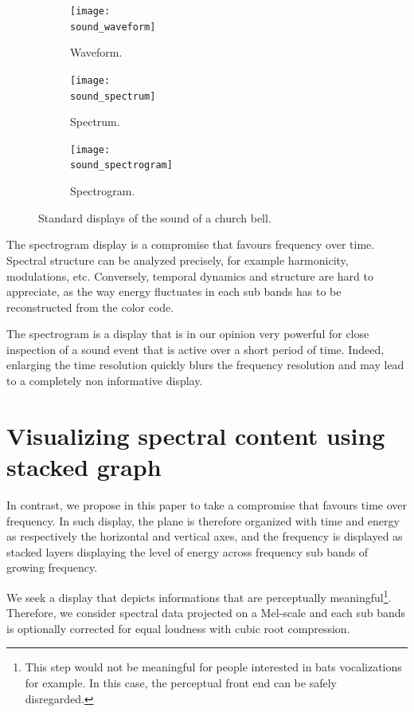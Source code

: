\documentclass{article}
\newcommand\sound{churchBell}
\begin{document}
\begin{figure}[!h]
 \centering
\begin{center}
\begin{subfigure}[b]{.5\textwidth}
\caption{Waveform.}
\texttt{[image: \\sound\_waveform]}
\label{fig:waveform}
\end{subfigure}
\begin{subfigure}[b]{.5\textwidth}
\caption{Spectrum.}
\texttt{[image: \\sound\_spectrum]}
\label{fig:spectrum}
\end{subfigure}
\begin{subfigure}[b]{.5\textwidth}
\caption{Spectrogram.}
\texttt{[image: \\sound\_spectrogram]}
\label{fig:spectrogram}
\end{subfigure}
\caption{Standard displays of the sound of a church bell.}
\label{fig:standard}
\end{center}
\end{figure}

The spectrogram display is a compromise that favours frequency over time. Spectral structure can be analyzed precisely, for example harmonicity, modulations, etc. Conversely, temporal dynamics and structure are hard to appreciate, as the way energy fluctuates in each sub bands has to be reconstructed from the color code.

The spectrogram is a display that is in our opinion very powerful for close inspection of a sound event that is active over a short period of time. Indeed, enlarging the time resolution quickly blurs the frequency resolution and may lead to a completely non informative display.

\section{Visualizing spectral content using stacked graph}\label{sec:spack}

In contrast, we propose in this paper to take a compromise that favours time over frequency. In such display, the plane is therefore organized with time and energy as respectively the horizontal and vertical axes, and the frequency is displayed as stacked layers displaying the level of energy across frequency sub bands of growing frequency.

We seek a display that depicts informations that are perceptually meaningful\footnote{This step would not be meaningful for people interested in bats vocalizations for example. In this case, the perceptual front end can be safely disregarded.}. Therefore, we consider spectral data projected on a Mel-scale \cite{Stevens1937} and each sub bands is optionally corrected for equal loudness \cite{Robinson1956} with cubic root compression. %
\end{document}

